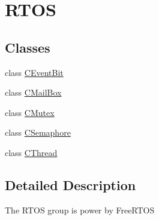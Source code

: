 \hypertarget{group___r_t_o_s}{\section{R\-T\-O\-S}
\label{group___r_t_o_s}
}
\subsection*{Classes}
\begin{DoxyCompactItemize}
\item 
class \hyperlink{class_c_event_bit}{C\-Event\-Bit}
\item 
class \hyperlink{class_c_mail_box}{C\-Mail\-Box}
\item 
class \hyperlink{class_c_mutex}{C\-Mutex}
\item 
class \hyperlink{class_c_semaphore}{C\-Semaphore}
\item 
class \hyperlink{class_c_thread}{C\-Thread}
\end{DoxyCompactItemize}


\subsection{Detailed Description}
The R\-T\-O\-S group is power by Free\-R\-T\-O\-S 